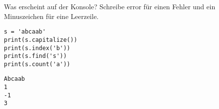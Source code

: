 \question[4] Was erscheint auf der Konsole? Schreibe error für einen Fehler und ein Minuszeichen
für eine Leerzeile.
\begin{lstlisting}
s = 'abcaab'
print(s.capitalize())
print(s.index('b'))
print(s.find('s'))
print(s.count('a'))
\end{lstlisting}
\begin{solutionbox}{3cm}
\begin{lstlisting}
Abcaab
1
-1
3
\end{lstlisting}
\end{solutionbox}
